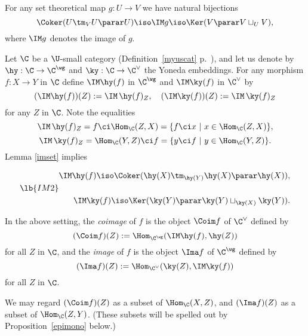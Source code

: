 \documentclass[12pt]{article}
\theoremstyle{remark}
\theoremstyle{definition}
\begin{document}
\begin{lem} 
For any set theoretical map $g:U\to V$ we have natural bijections 
$$ 
\Coker(U\tm_VU\parar U)\iso\IM g\iso\Ker(V\parar V\sqcup_UV),
$$ 
where $\IM g$ denotes the image of $g$. 
\end{lem} 

Let $\C$ be a $\U$-small category (Definition~\ref{myuscat} p.~), and let us denote by $\hy:\C\to\C^\wg$ and $\ky:\C\to\C^\vee$ the Yoneda embeddings. For any morphism $f:X\to Y$ in $\C$ define $\IM\hy(f)$ in $\C^\wg$ and $\IM\ky(f)$ in $\C^\vee$ by
$$
(\IM\hy(f))(Z):=\IM\,\hy(f)_Z,\quad(\IM\ky(f))(Z):=\IM\,\ky(f)_Z 
$$
for any $Z$ in $\C$. Note the equalities 
$$
\IM\,\hy(f)_Z=f\ci\Hom_\C(Z,X)=\{f\ci x\ |\ x\in\Hom_\C(Z,X)\},
$$ 
$$
\IM\,\ky(f)_Z=\Hom_\C(Y,Z)\ci f=\{y\ci f\ |\ y\in\Hom_\C(Y,Z)\}.
$$ 
Lemma \ref{imset} implies

\begin{equation}\lb{IM2}
\begin{split}
\IM\hy(f)\iso\Coker(\hy(X)\tm_{\hy(Y)}\hy(X)\parar\hy(X)),\\ \\ 
\IM\ky(f)\iso\Ker(\ky(Y)\parar\ky(Y)\sqcup_{\ky(X)}\ky(Y)).
\end{split}
\end{equation}

\begin{df}%
In the above setting, the {\em coimage} of $f$ is the object $\Coim f$ of $\C^\vee$ defined by 
$$ 
(\Coim f)(Z):=\Hom_{\C^\wg}(\IM\hy(f),\hy(Z))
$$ 
for all $Z$ in $\C$, and the {\em image} of $f$ is the object $\Ima f$ of $\C^\wg$ defined by 
$$ 
(\Ima f)(Z):=\Hom_{\C^\vee}(\ky(Z),\IM\ky(f)) 
$$ 
for all $Z$ in $\C$. 
\end{df} 

\begin{prop}
We may regard $(\Coim f)(Z)$ as a subset of $\Hom_\C(X,Z)$, and $(\Ima f)(Z)$ as a subset of $\Hom_\C(Z,Y)$. (These subsets will be spelled out by Proposition~\ref{epimono} below.)
\end{prop}
\end{document}
